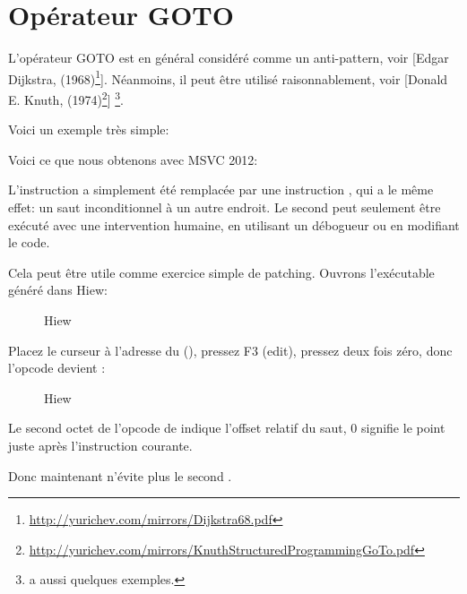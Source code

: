 \section{Opérateur GOTO}

L'opérateur GOTO est en général considéré comme un anti-pattern, voir
[Edgar Dijkstra,  (1968)\footnote{\url{http://yurichev.com/mirrors/Dijkstra68.pdf}}].
Néanmoins, il peut être utilisé raisonnablement, voir
[Donald E. Knuth,  (1974)\footnote{\url{http://yurichev.com/mirrors/KnuthStructuredProgrammingGoTo.pdf}}]
\footnote{\InSqBrackets{\CNotes} a aussi quelques exemples.}.

Voici un exemple très simple:



Voici ce que nous obtenons avec MSVC 2012:



L'instruction  a simplement été remplacée par une instruction \JMP, qui
a le même effet: un saut inconditionnel à un autre endroit.
Le second \printf peut seulement être exécuté avec une intervention humaine, en
utilisant un débogueur ou en modifiant le code.

\par

\clearpage

Cela peut être utile comme exercice simple de patching. Ouvrons l'exécutable généré
dans Hiew:

\begin{figure}[H]
\centering
{}
\caption{Hiew}
\label{fig:goto_hiew1}
\end{figure}

\clearpage
Placez le curseur à l'adresse du \JMP (),
pressez F3 (edit), pressez deux fois zéro, donc l'opcode devient :

\begin{figure}[H]
\centering
{}
\caption{Hiew}
\label{fig:goto_hiew2}
\end{figure}

Le second octet de l'opcode de \JMP indique l'offset relatif du saut, 0 signifie
le point juste après l'instruction courante.

Donc maintenant \JMP n'évite plus le second \printf.


